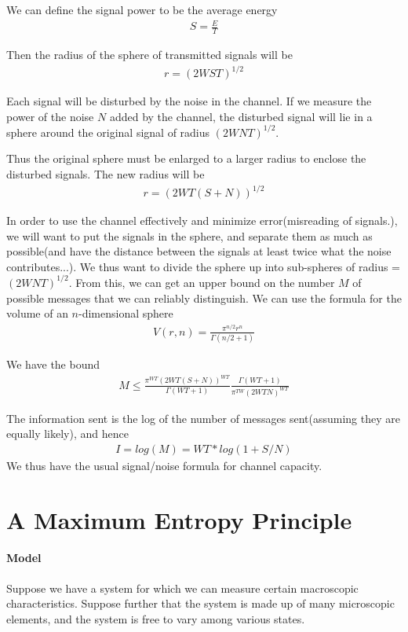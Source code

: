 \documentclass[10 pt,final]{article}
\newcommand{\impo}[1]{{\color{magenta} #1}}
\begin{document}
We can define the \impo{signal power} to be the average energy
\begin{align*}
S = \frac{E}{T}
\end{align*}

Then the \impo{radius} of the sphere of transmitted signals will be
\begin{align*}
r = (2WST)^{1/2}
\end{align*}

Each signal will be disturbed by the noise in the channel. If we measure the power of the noise $N$ added by the channel, the disturbed signal will lie in a sphere around the original signal of radius $(2WNT)^{1/2}$.

Thus the original sphere must be \impo{enlarged} to a larger radius to enclose the disturbed signals. The new radius will be
\begin{align*}
r = (2WT(S+N))^{1/2}
\end{align*}

In order to use the channel effectively and minimize error(misreading of signals.), we will want to put the signals in the sphere, \impo{and separate them as much as possible}(and have the distance between the signals \impo{at least twice} what the noise contributes...). We thus want to divide the sphere up into sub-spheres of radius = $(2WNT)^{1/2}$. From this, we can get an upper bound on the number $M$ of possible messages that we can reliably distinguish. We can use the formula for \impo{the volume of an $n$-dimensional sphere}
\begin{align*}
V(r,n) = \frac{\pi^{n/2} r^n}{\Gamma(n/2+1)}
\end{align*}

We have the bound
\begin{align*}
M \leq \frac{\pi^{WT} (2WT(S+N))^{WT}}{\Gamma(WT+1)} \frac{\Gamma(WT+1)}{\pi^{TW}(2WTN)^{WT}}
\end{align*}

The information sent is \impo{the log of the number of messages sent}(assuming they are equally likely), and hence
\begin{align*}
I = log(M) = WT*log(1+S/N)
\end{align*}
We thus have the usual signal/noise formula for channel capacity.
\section{A Maximum Entropy Principle}
\paragraph{Model} Suppose we have a system for which we can measure certain macroscopic characteristics. Suppose further that the system is made up of many microscopic elements, and the system is free to vary among various states. 
\end{document}
